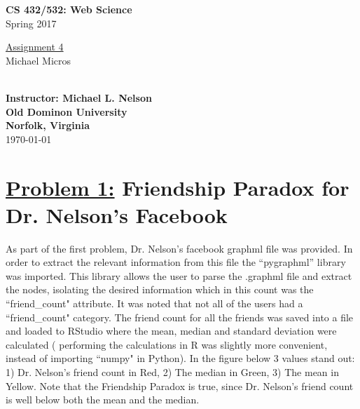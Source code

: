 \documentclass{article}
\begin{document}

\begin{titlepage}

\vspace*{45 pt}
\begin{center}
\Huge{\bf CS 432/532:  Web Science}\\
\huge{Spring 2017\\}

\vspace{60 pt}
\Huge\underline {Assignment 4}\\

\vspace{10 pt}
\Huge{Michael Micros}\\\

{\Large \bf {Instructor: Michael L. Nelson}}\\

\vspace{230 pt}
{\huge \bf {Old Dominon University}}\\
{\huge \bf {Norfolk, Virginia}}\\

\vspace{10 pt}
\today

\end{center}
\end{titlepage}





\section*{{\underline{\huge {Problem 1:}} Friendship Paradox for Dr. Nelson's Facebook}}
	 As part of the first problem, Dr. Nelson's facebook graphml file was provided. In order to extract the relevant information from this file the ``pygraphml'' library was imported. This library allows the user to parse the .graphml file and extract the nodes, isolating the desired information which in this count was the ``friend\_count" attribute. It was noted that not all of the users had a ``friend\_count" category. The friend count for all the friends was saved into a file and loaded to RStudio where the mean, median and standard deviation were calculated ( performing the calculations in R was slightly more convenient, instead of importing ``numpy" in Python). In the figure below 3 values stand out: 1) Dr. Nelson's friend count in Red, 2) The median in Green, 3) The mean in Yellow. Note that the Friendship Paradox is true, since Dr. Nelson's friend count is well below both the mean and the median.
\end{document}
